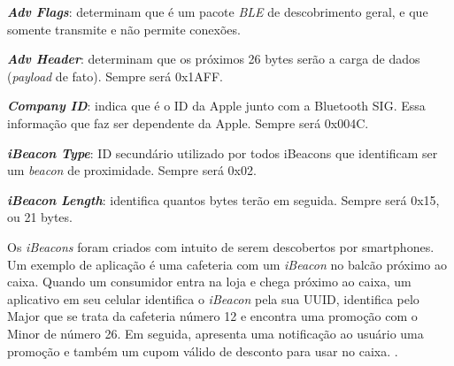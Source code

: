 \documentclass[
	12pt,				%
	openright,			%
	oneside,			%
	a4paper,			%
	chapter=TITLE,		%
	english,			%
	brazil				%
	]{abntex2}
\begin{document}
{\begin{alineas}
	\item \textit{\textbf{Adv Flags}}: determinam que é um pacote \textit{BLE} de descobrimento geral, e que somente transmite e não permite conexões.
	\item \textit{\textbf{Adv Header}}: determinam que os próximos 26 bytes serão a carga de dados (\textit{payload} de fato). Sempre será 0x1AFF.
	\item \textit{\textbf{Company ID}}: indica que é o ID da Apple junto com a Bluetooth SIG. Essa informação que faz ser dependente da Apple. Sempre será 0x004C.
	\item\textit{\textbf{iBeacon Type}}: ID secundário utilizado por todos iBeacons que identificam ser um \textit{beacon} de proximidade. Sempre será 0x02.
	\item\textit{\textbf{iBeacon Length}}: identifica quantos bytes terão em seguida. Sempre será 0x15, ou 21 bytes.
\end{alineas}

\begin{figure}[htb]
\end{figure}

Os \textit{iBeacons} foram criados com intuito de serem descobertos por smartphones. Um exemplo de aplicação é uma cafeteria com um \textit{iBeacon} no balcão próximo ao caixa. Quando um consumidor entra na loja e chega próximo ao caixa, um aplicativo em seu celular identifica o \textit{iBeacon} pela sua UUID, identifica pelo Major que se trata da cafeteria número 12 e encontra uma promoção com o Minor de número 26. Em seguida, apresenta uma notificação ao usuário uma promoção e também um cupom válido de desconto para usar no caixa. \cite{arm-beacons}.

}
\end{document}
